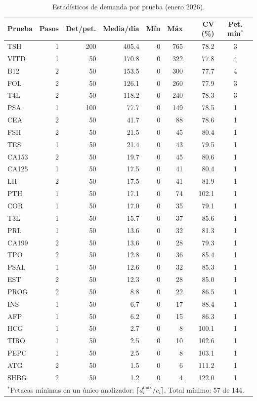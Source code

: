 \documentclass[12pt, a4paper]{article}
\begin{document}
\begin{table}[H]
\centering
\caption{Estadísticos de demanda por prueba (enero 2026).}
\small
\begin{tabular}{lrrrrrrc}
\toprule
\textbf{Prueba} & \textbf{Pasos} & \textbf{Det/pet.} & \textbf{Media/día} & \textbf{Mín} & \textbf{Máx} & \textbf{CV (\%)} & \textbf{Pet. mín$^*$} \\
\midrule
TSH   & 1 & 200 & 405.4 & 0 & 765 & 78.2  & 3 \\
VITD  & 1 &  50 & 170.8 & 0 & 322 & 77.8  & 4 \\
B12   & 2 &  50 & 153.5 & 0 & 300 & 77.7  & 4 \\
FOL   & 2 &  50 & 126.1 & 0 & 260 & 77.9  & 3 \\
T4L   & 2 &  50 & 118.2 & 0 & 240 & 78.3  & 3 \\
PSA   & 1 & 100 &  77.7 & 0 & 149 & 78.5  & 1 \\
CEA   & 2 &  50 &  41.7 & 0 &  88 & 78.6  & 1 \\
FSH   & 2 &  50 &  21.5 & 0 &  45 & 80.4  & 1 \\
TES   & 1 &  50 &  21.4 & 0 &  43 & 79.5  & 1 \\
CA153 & 2 &  50 &  19.7 & 0 &  45 & 80.6  & 1 \\
CA125 & 1 &  50 &  17.5 & 0 &  41 & 80.4  & 1 \\
LH    & 2 &  50 &  17.5 & 0 &  41 & 81.9  & 1 \\
PTH   & 1 &  50 &  17.1 & 0 &  74 & 102.1 & 1 \\
COR   & 1 &  50 &  17.0 & 0 &  35 & 79.1  & 1 \\
T3L   & 1 &  50 &  15.7 & 0 &  37 & 85.6  & 1 \\
PRL   & 1 &  50 &  13.6 & 0 &  32 & 81.3  & 1 \\
CA199 & 2 &  50 &  13.6 & 0 &  28 & 79.3  & 1 \\
TPO   & 2 &  50 &  12.8 & 0 &  36 & 85.4  & 1 \\
PSAL  & 1 &  50 &  12.6 & 0 &  32 & 85.3  & 1 \\
EST   & 2 &  50 &  12.3 & 0 &  28 & 85.0  & 1 \\
PROG  & 2 &  50 &   8.8 & 0 &  22 & 86.5  & 1 \\
INS   & 1 &  50 &   6.7 & 0 &  17 & 88.4  & 1 \\
AFP   & 1 &  50 &   6.2 & 0 &  15 & 86.3  & 1 \\
HCG   & 1 &  50 &   2.7 & 0 &   8 & 100.1 & 1 \\
TIRO  & 1 &  50 &   2.5 & 0 &  10 & 102.6 & 1 \\
PEPC  & 1 &  50 &   2.5 & 0 &   8 & 103.1 & 1 \\
ATG   & 2 &  50 &   1.5 & 0 &   6 & 111.2 & 1 \\
SHBG  & 2 &  50 &   1.2 & 0 &   4 & 122.0 & 1 \\
\bottomrule
\multicolumn{8}{l}{$^*$Petacas mínimas en un único analizador: $\lceil d_i^{\max}/c_i \rceil$.
Total mínimo: 57 de 144.}
\end{tabular}
\end{table}
\end{document}
